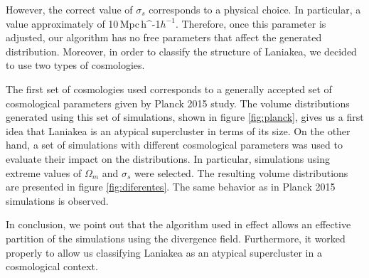 \documentclass[usenatbib]{mnras}
\newcommand{\Mpch}{\,{\rm Mpc}\,\ifmmode h^{-1}\else $h^{-1}$\fi}
\begin{document}
However, the correct value of $\sigma_s$ corresponds to a physical choice. In particular, a value approximately of 10\Mpch. Therefore, once this parameter is adjusted, our algorithm has no free parameters that affect the generated distribution. Moreover, in order to classify the structure of Laniakea, we decided to use two types of cosmologies. 

The first set of cosmologies used corresponds to a generally accepted set of cosmological parameters given by Planck 2015 study. The volume distributions generated using this set of simulations, shown in figure \ref{fig:planck}, gives us a first idea that Laniakea is an atypical supercluster in terms of its size. On the other hand, a set of simulations with different cosmological parameters was used to evaluate their impact on the distributions. In particular, simulations using extreme values of $\Omega_m$ and $\sigma_s$ were selected. The resulting volume distributions are presented in figure \ref{fig:diferentes}. The same behavior as in Planck 2015 simulations is observed. 

In conclusion, we point out that the algorithm used in effect allows an effective partition of the simulations using the divergence field. Furthermore, it worked properly to allow us classifying Laniakea as an atypical supercluster in a cosmological context.









\end{document}
